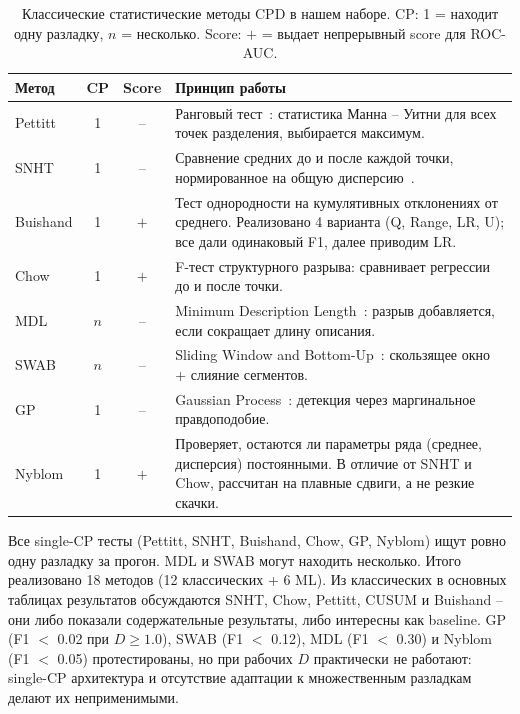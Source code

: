 \documentclass[12pt,a4paper]{article}
\begin{document}
\begin{table}[ht]
\centering
\small
\caption{Классические статистические методы CPD в нашем наборе. CP: 1 = находит одну разладку, $n$ = несколько. Score: $+$ = выдает непрерывный score для ROC-AUC.}
\label{tab:classical_methods}
\begin{tabular}{lccp{7.5cm}}
\hline
\textbf{Метод} & \textbf{CP} & \textbf{Score} & \textbf{Принцип работы} \\
\hline
Pettitt & 1 &  -- & Ранговый тест~\cite{pettitt1979}: статистика Манна -- Уитни для всех точек разделения, выбирается максимум. \\[2pt]
SNHT & 1 &  -- & Сравнение средних до и после каждой точки, нормированное на общую дисперсию~\cite{basseville1993}. \\[2pt]
Buishand & 1 & $+$ & Тест однородности на кумулятивных отклонениях от среднего. Реализовано 4 варианта (Q, Range, LR, U); все дали одинаковый F1, далее приводим LR. \\[2pt]
Chow & 1 & $+$ & F-тест структурного разрыва: сравнивает регрессии до и после точки. \\[2pt]
MDL & $n$ &  -- & Minimum Description Length~\cite{yao1988}: разрыв добавляется, если сокращает длину описания. \\[2pt]
SWAB & $n$ &  -- & Sliding Window and Bottom-Up~\cite{keogh2004}: скользящее окно + слияние сегментов. \\[2pt]
GP & 1 &  -- & Gaussian Process~\cite{saatci2010}: детекция через маргинальное правдоподобие. \\[2pt]
Nyblom & 1 & $+$ & Проверяет, остаются ли параметры ряда (среднее, дисперсия) постоянными. В отличие от SNHT и Chow, рассчитан на плавные сдвиги, а не резкие скачки. \\
\hline
\end{tabular}
\end{table}

Все single-CP тесты (Pettitt, SNHT, Buishand, Chow, GP, Nyblom) ищут ровно одну разладку за прогон. MDL и SWAB могут находить несколько. Итого реализовано 18 методов (12 классических + 6 ML). Из классических в основных таблицах результатов обсуждаются SNHT, Chow, Pettitt, CUSUM и Buishand  -- они либо показали содержательные результаты, либо интересны как baseline. GP (F1 $<$ 0.02 при $D \geq 1.0$), SWAB (F1 $<$ 0.12), MDL (F1 $<$ 0.30) и Nyblom (F1 $<$ 0.05) протестированы, но при рабочих $D$ практически не работают: single-CP архитектура и отсутствие адаптации к множественным разладкам делают их неприменимыми.
\end{document}
